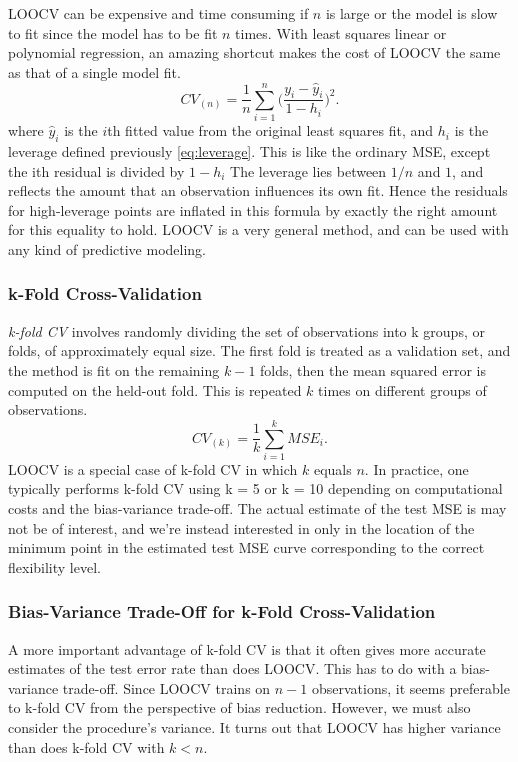 \documentclass{article}
\numberwithin{equation}{section}
\begin{document}
\begin{enumerate}
LOOCV can be expensive and time consuming if $n$ is large or the model is slow to fit since the model has to be fit $n$ times. With least squares linear or polynomial regression, an amazing shortcut makes the cost of LOOCV the same as that of a single model fit.
\begin{equation}
     CV_{(n)} = \frac{1}{n} \sum_{i=1}^n \Bigg ( \frac{y_i-\hat y_i}{1-h_i} \Bigg )^2.
\end{equation}
where $\hat y_i$ is the $i$th fitted value from the original least squares fit, and $h_i$ is the leverage defined previously \eqref{eq:leverage}. This is like the ordinary MSE, except the ith residual is divided by $1 - h_i$ The leverage lies between $1/n$ and $1$, and reflects the amount that an observation influences its own fit. Hence the residuals for high-leverage points are inflated in this formula by exactly the right amount for this equality to hold. LOOCV is a very general method, and can be used with any kind of predictive modeling.

\subsubsection{k-Fold Cross-Validation}
\textit{k-fold CV} involves randomly dividing the set of observations into k groups, or folds, of approximately equal size.  The first fold is treated as a validation set, and the method is fit on the remaining $k - 1$ folds, then the mean squared error is computed on the held-out fold. This is repeated $k$ times on different groups of observations.
\begin{equation}
    CV_{(k)} = \frac{1}{k} \sum_{i=1}^k MSE_i.
\end{equation}
LOOCV is a special case of k-fold CV in which $k$ equals $n$. In practice, one typically performs k-fold CV using k = 5 or k = 10 depending on computational costs and the bias-variance trade-off. 
The actual estimate of the test MSE is may not be of interest, and we're instead interested in only in the location of
the minimum point in the estimated test MSE curve corresponding to the correct flexibility level.

\subsubsection{Bias-Variance Trade-Off for k-Fold Cross-Validation}

A more important advantage of k-fold CV is that it often gives more accurate estimates of the test error rate than does LOOCV. This has to do with a bias-variance trade-off. Since LOOCV trains on $n-1$ observations, it seems preferable to  k-fold CV from the perspective of bias reduction. However, we must also consider the procedure’s variance. It turns out that LOOCV has higher variance than does k-fold CV with $k<n$.


\end{enumerate}
\end{document}
